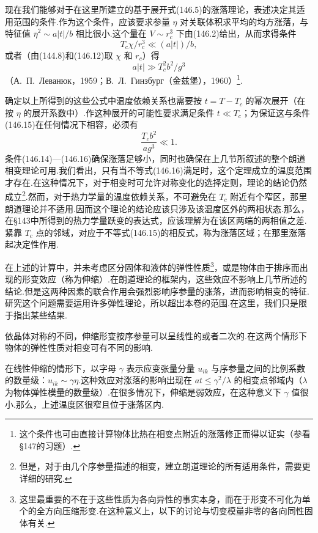 现在我们能够对于在这里所建立的基于展开式(146.5)的涨落理论，表述决定其适用范围的条件.作为这个条件，应该要求参量 $\eta$ 对关联体积求平均的均方涨落，与特征值 $\overline{\eta}^2\sim a|t|/b$ 相比很小.这个量在 $V\sim r_c^3$ 下由(146.2)给出，从而求得条件
\begin{equation}
  T_c\chi/r_c^3\ll(a|t|)/b,
\end{equation}
或者（由(144.8)和(146.12)取 $\chi$ 和 $r_c$）得
\begin{equation}
  a|t|\gg T_c^2b^2/g^3
\end{equation}
（А.~П.~Леванюк，1959；В.~Л.~Гинзбург（金兹堡），1960）\footnote{这个条件也可由直接计算物体比热在相变点附近的涨落修正而得以证实（参看§147的习题）.}.

确定以上所得到的这些公式中温度依赖关系也需要按 $t=T-T_c$ 的幂次展开（在按 $\eta$ 的展开系数中）.作这种展开的可能性要求满足条件 $t\ll T_c$；为保证这与条件(146.15)在任何情况下相容，必须有
\begin{equation}
  \frac{T_cb^2}{ag^3}\ll1.
\end{equation}
条件(146.14)—(146.16)确保涨落足够小，同时也确保在上几节所叙述的整个朗道相变理论可用.我们看出，只有当不等式(146.16)满足时，这个定理成立的温度范围才存在.在这种情况下，对于相变时可允许对称变化的选择定则，理论的结论仍然成立\footnote{但是，对于由几个序参量描述的相变，建立朗道理论的所有适用条件，需要更详细的研究.}.然而，对于热力学量的温度依赖关系，不可避免在 $T_c$ 附近有个窄区，那里朗道理论并不适用.因而这个理论的结论应该只涉及该温度区外的两相状态.那么，在§143中所得到的热力学量跃变的表达式，应该理解为在该区两端的两相值之差.紧靠 $T_c$ 点的邻域，对应于不等式(146.15)的相反式，称为涨落区域；在那里涨落起决定性作用.

在上述的计算中，并未考虑区分固体和液体的弹性性质\footnote{这里最重要的不在于这些性质为各向异性的事实本身，而在于形变不可化为单个的全方向压缩形变.在这种意义上，以下的讨论与切变模量非零的各向同性固体有关.}，或是物体由于排序而出现的形变效应（称为伸缩）.在朗道理论的框架内，这些效应不影响上几节所述的结论.但是这两种因素的联合作用会强烈影响序参量的涨落，进而影响相变的特征.研究这个问题需要运用许多弹性理论，所以超出本卷的范围.在这里，我们只是限于指出某些结果.

依晶体对称的不同，伸缩形变按序参量可以呈线性的或者二次的.在这两个情形下物体的弹性性质对相变可有不同的影响.

在线性伸缩的情形下，以字母 $\gamma$ 表示应变张量分量 $u_{ik}$ 与序参量之间的比例系数的数量级：$u_{ik}\sim\gamma\eta$.这种效应对涨落的影响出现在 $at\leqslant\gamma^2/\lambda$ 的相变点邻域内（$\lambda$ 为物体弹性模量的数量级）.在很多情况下，伸缩是弱效应，在这种意义下 $\gamma$ 值很小.那么，上述温度区很窄且位于涨落区内.

